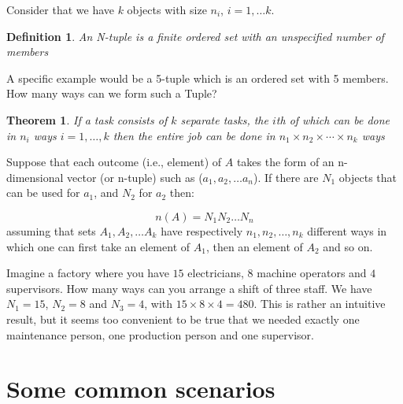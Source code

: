 \documentclass[12pt]{extbook}
\newtheorem{df}{Definition}[section]
\newtheorem{tm}{Theorem}[section]
\begin{document}
Consider that we have $k$ objects with size  $n_i$, $i=1, \dots k$.

\begin{df}
An N-tuple is a finite ordered set with an unspecified number of members
\end{df}

A specific example would be a 5-tuple which is an ordered set with 5 members.   How many ways can we form such a Tuple?

\begin{tm}
If a task consists of $k$ separate tasks, the $i$th of which can be done in $n_i$ ways $i=1,\ldots,k$ then the entire job can be done in $n_1 \times n_2 \times \cdots \times n_k$ ways
\end{tm}



Suppose that each outcome (i.e., element) of $A$ takes the form of an n-dimensional vector (or n-tuple) such as ($a_1, a_2, \ldots a_n$).   If there are $N_1$ objects that can be used for $a_1$, and $N_2$ for $a_2$ then:

\begin{equation}
n(A) = N_1N_2 \ldots N_n   
\end{equation}
assuming that sets $A_1, A_2, \ldots A_k$ have respectively $n_1, n_2, \ldots, n_k$ different ways in which one can first take an element of $A_1$, then an element of $A_2$ and so on.


Imagine a factory where you have $15$ electricians, $8$ machine operators and $4$ supervisors.   How many ways can you arrange a shift of three staff.  We have $N_1 = 15$, $N_2=8$ and $N_3=4$, with $15 \times 8 \times 4 = 480$.  This is rather an intuitive result, but it seems too convenient to be true that we needed exactly one maintenance person, one production person and one supervisor.   




\section{Some common scenarios}
\end{document}
